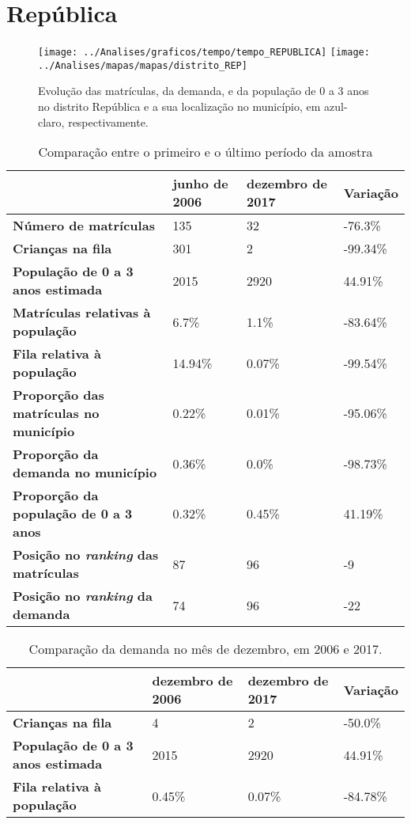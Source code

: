 \section{República}
\begin{figure}[H]
\centering
\texttt{[image: ../Analises/graficos/tempo/tempo\_REPUBLICA]}
\texttt{[image: ../Analises/mapas/mapas/distrito\_REP]}
\caption{Evolução das matrículas, da demanda, e da população de 0 a 3 anos no distrito República e a sua localização no município, em azul-claro, respectivamente.}
\end{figure}
\begin{table}[H]
\begin{tabular}{l|l|l|l}
\textbf{}                                      & \textbf{junho de 2006}       & \textbf{dezembro de 2017}    & \textbf{Variação} \\ \hline
\textbf{Número de matrículas}                  & 135 & 32 & -76.3\% \\ \hline
\textbf{Crianças na fila}                      & 301 & 2 & -99.34\% \\ \hline
\textbf{População de 0 a 3 anos estimada}      & 2015 & 2920 & 44.91\% \\ \hline
\textbf{Matrículas relativas à população}      & 6.7\% & 1.1\% & -83.64\% \\ \hline
\textbf{Fila relativa à população}             & 14.94\% & 0.07\% & -99.54\% \\ \hline
\textbf{Proporção das matrículas no município} & 0.22\% & 0.01\% & -95.06\% \\ \hline
\textbf{Proporção da demanda no município}     & 0.36\% & 0.0\% & -98.73\% \\ \hline
\textbf{Proporção da população de 0 a 3 anos}  & 0.32\% & 0.45\% & 41.19\% \\ \hline
\textbf{Posição no \textit{ranking} das matrículas}     & 87 & 96 & -9 \\ \hline
\textbf{Posição no \textit{ranking} da demanda}         & 74 & 96 & -22 \\ 
\end{tabular}
\caption{Comparação entre o primeiro e o último período da amostra}
\end{table}
\begin{table}[H]
\begin{tabular}{l|l|l|l}
\textbf{}                                 & \textbf{dezembro de 2006} & \textbf{dezembro de 2017} & \textbf{Variação} \\ \hline
\textbf{Crianças na fila}                      & 4 & 2 & -50.0\% \\ \hline
\textbf{População de 0 a 3 anos estimada}      & 2015 & 2920 & 44.91\% \\ \hline
\textbf{Fila relativa à população}             & 0.45\% & 0.07\% & -84.78\% \\
\end{tabular}
\caption{Comparação da demanda no mês de dezembro, em 2006 e 2017.}
\end{table}
